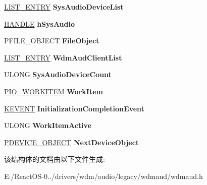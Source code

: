\begin{DoxyCompactItemize}
\hyperlink{struct___l_i_s_t___e_n_t_r_y}{L\+I\+S\+T\+\_\+\+E\+N\+T\+RY} {\bfseries Sys\+Audio\+Device\+List}
\item 
\mbox{\label{struct_w_d_m_a_u_d___d_e_v_i_c_e___e_x_t_e_n_s_i_o_n_a2e4ed46ad7d88d46ff48afc6b8b84ab2}} 
\hyperlink{interfacevoid}{H\+A\+N\+D\+LE} {\bfseries h\+Sys\+Audio}
\item 
\mbox{\label{struct_w_d_m_a_u_d___d_e_v_i_c_e___e_x_t_e_n_s_i_o_n_a332508fe4a6fc35f1cce5299545c9b8f}} 
P\+F\+I\+L\+E\+\_\+\+O\+B\+J\+E\+CT {\bfseries File\+Object}
\item 
\mbox{\label{struct_w_d_m_a_u_d___d_e_v_i_c_e___e_x_t_e_n_s_i_o_n_a42b2546f32b8eafed33928f5b26ce364}} 
\hyperlink{struct___l_i_s_t___e_n_t_r_y}{L\+I\+S\+T\+\_\+\+E\+N\+T\+RY} {\bfseries Wdm\+Aud\+Client\+List}
\item 
\mbox{\label{struct_w_d_m_a_u_d___d_e_v_i_c_e___e_x_t_e_n_s_i_o_n_ae4bae18027f6f84d2c3de2504a872cba}} 
U\+L\+O\+NG {\bfseries Sys\+Audio\+Device\+Count}
\item 
\mbox{\label{struct_w_d_m_a_u_d___d_e_v_i_c_e___e_x_t_e_n_s_i_o_n_ac1aabf120829e7d6f9de3b6ebb24165c}} 
\hyperlink{struct___i_o___w_o_r_k_i_t_e_m}{P\+I\+O\+\_\+\+W\+O\+R\+K\+I\+T\+EM} {\bfseries Work\+Item}
\item 
\mbox{\label{struct_w_d_m_a_u_d___d_e_v_i_c_e___e_x_t_e_n_s_i_o_n_a6c0ce3c2a8a1e716d3a1081ee487db16}} 
\hyperlink{struct___k_e_v_e_n_t}{K\+E\+V\+E\+NT} {\bfseries Initialization\+Completion\+Event}
\item 
\mbox{\label{struct_w_d_m_a_u_d___d_e_v_i_c_e___e_x_t_e_n_s_i_o_n_ac0fdaf8bca1700465ee295ed0f2c399d}} 
U\+L\+O\+NG {\bfseries Work\+Item\+Active}
\item 
\mbox{\label{struct_w_d_m_a_u_d___d_e_v_i_c_e___e_x_t_e_n_s_i_o_n_ae9c1dc8546c9675fd070274d48fd222b}} 
\hyperlink{struct___d_e_v_i_c_e___o_b_j_e_c_t}{P\+D\+E\+V\+I\+C\+E\+\_\+\+O\+B\+J\+E\+CT} {\bfseries Next\+Device\+Object}
\end{DoxyCompactItemize}


该结构体的文档由以下文件生成\+:\begin{DoxyCompactItemize}
\item 
E\+:/\+React\+O\+S-\/0../drivers/wdm/audio/legacy/wdmaud/wdmaud.\+h\end{DoxyCompactItemize}
